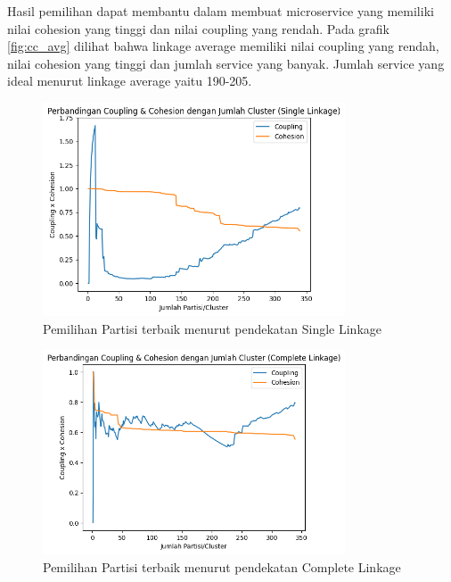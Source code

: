 Hasil pemilihan dapat membantu dalam membuat microservice yang memiliki nilai cohesion yang tinggi dan nilai coupling yang rendah. Pada grafik \ref{fig:cc_avg} dilihat bahwa linkage average memiliki nilai coupling yang rendah, nilai cohesion yang tinggi dan jumlah service yang banyak. Jumlah service yang ideal menurut linkage average yaitu 190-205. 

\begin{figure}[htbp]
	\centering
	\includegraphics[width=0.8\textwidth]{img/bab_4/cc_single.png}
	\caption{Pemilihan Partisi terbaik menurut pendekatan Single Linkage }
	\label{fig:cc_single}
	
\end{figure}

\begin{figure}[h]
	\centering
	\includegraphics[width=0.8\textwidth]{img/bab_4/cc_comp.png}
	\caption{Pemilihan Partisi terbaik menurut pendekatan Complete Linkage }
	\label{fig:cc_complete}
\end{figure}

